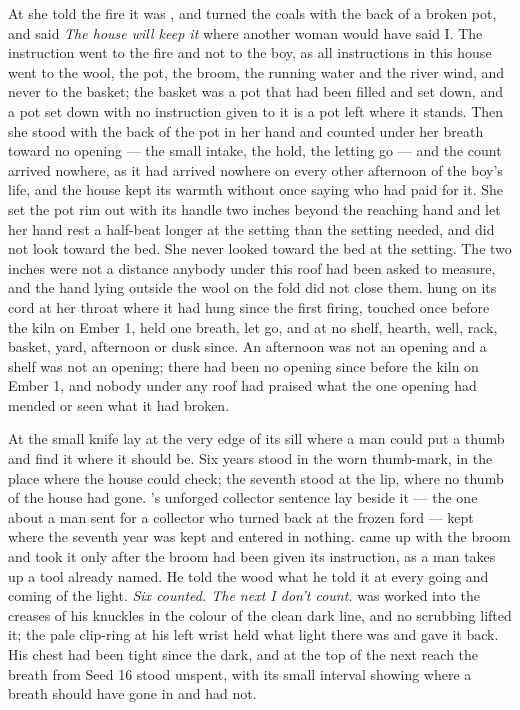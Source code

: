 At  she told the fire it was , and turned the coals with the back of a broken pot, and said \emph{The house will keep it} where another woman would have said I. The instruction went to the fire and not to the boy, as all instructions in this house went to the wool, the pot, the broom, the running water and the river wind, and never to the basket; the basket was a pot that had been filled and set down, and a pot set down with no instruction given to it is a pot left where it stands. Then she stood with the back of the pot in her hand and counted under her breath toward no opening --- the small intake, the hold, the letting go --- and the count arrived nowhere, as it had arrived nowhere on every other afternoon of the boy's life, and the house kept its warmth without once saying who had paid for it. She set the pot rim out with its handle two inches beyond the reaching hand and let her hand rest a half-beat longer at the setting than the setting needed, and did not look toward the bed. She never looked toward the bed at the setting. The two inches were not a distance anybody under this roof had been asked to measure, and the hand lying outside the wool on the fold did not close them.  hung on its cord at her throat where it had hung since the first firing, touched once before the kiln on Ember 1, held one breath, let go, and at no shelf, hearth, well, rack, basket, yard, afternoon or dusk since. An afternoon was not an opening and a shelf was not an opening; there had been no opening since before the kiln on Ember 1, and nobody under any roof had praised what the one opening had mended or seen what it had broken.

\scenebreak

At  the small knife lay at the very edge of its sill where a man could put a thumb and find it where it should be. Six years stood in the worn thumb-mark, in the place where the house could check; the seventh stood at the lip, where no thumb of the house had gone. 's unforged collector sentence lay beside it --- the one about a man sent for a collector who turned back at the frozen ford --- kept where the seventh year was kept and entered in nothing.  came up with the broom and took it only after the broom had been given its instruction, as a man takes up a tool already named. He told the wood what he told it at every going and coming of the light. \emph{Six counted. The next I don't count.}  was worked into the creases of his knuckles in the colour of the clean dark line, and no scrubbing lifted it; the pale clip-ring at his left wrist held what light there was and gave it back. His chest had been tight since the dark, and at the top of the next reach the breath from Seed 16 stood unspent, with its small interval showing where a breath should have gone in and had not.

